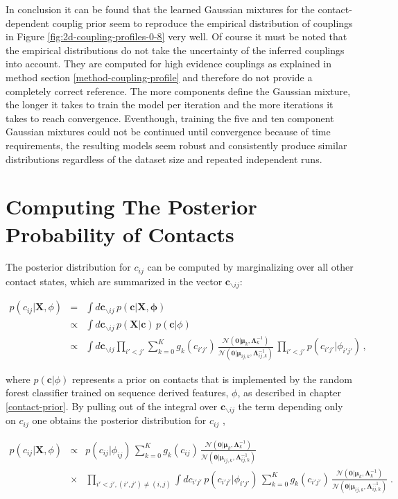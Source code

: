 \documentclass[11pt,a4paper,twoside]{book}
\newcommand{\Gauss}{\mathcal{N}}
\newcommand{\Lijk}{\mathbf{\Lambda}_{ij,k}}
\newcommand{\Lk}{\mathbf{\Lambda}_k}
\newcommand{\muijk}{\mathbf{\mu}_{ij,k}}
\newcommand{\muk}{\mathbf{\mu}_k}
\renewcommand{\c}{\mathbf{c}}
\newcommand{\cij}{c_{ij}}
\newcommand{\X}{\mathbf{X}}
\theoremstyle{definition}
\theoremstyle{definition}
\theoremstyle{remark}
\begin{document}
In conclusion it can be found that the learned Gaussian mixtures for the
contact-dependent couplig prior seem to reproduce the empirical
distribution of couplings in Figure \ref{fig:2d-coupling-profiles-0-8}
very well. Of course it must be noted that the empirical distributions
do not take the uncertainty of the inferred couplings into account. They
are computed for high evidence couplings as explained in method section
\ref{method-coupling-profile} and therefore do not provide a completely
correct reference. The more components define the Gaussian mixture, the
longer it takes to train the model per iteration and the more iterations
it takes to reach convergence. Eventhough, training the five and ten
component Gaussian mixtures could not be continued until convergence
because of time requirements, the resulting models seem robust and
consistently produce similar distributions regardless of the dataset
size and repeated independent runs.

\section{Computing The Posterior Probability of
Contacts}\label{posterior-of-rij}

The posterior distribution for \(c_{ij}\) can be computed by
marginalizing over all other contact states, which are summarized in the
vector \(\c_{\backslash ij}\):

\begin{eqnarray}
    p(\cij | \X, \phi) &=& \int d \c_{\backslash ij} \, p(\c |\X, \mathbf{\phi}) \nonumber\\
                &\propto & \int d \c_{\backslash ij} \, p(\X|\c) \, p(\c | \phi) \nonumber\\
                &\propto & \int d \c_{\backslash ij} \prod_{i'<j'} \sum_{k=0}^K g_{k}(c_{i'j'}) \, \frac{\Gauss( \mathbf{0} | \muk, \Lk^{-1})}{\Gauss(\mathbf{0} | \muijk, \Lijk^{-1})}
 \, \prod_{i'<j'} p(c_{i'j'} |\phi_{i'j'})  \,,
 \end{eqnarray}

where \(p(\c | \phi)\) represents a prior on contacts that is
implemented by the random forest classifier trained on sequence derived
features, \(\phi\), as described in chapter \ref{contact-prior}. By
pulling out of the integral over \(\c_{\backslash ij}\) the term
depending only on \(\cij\) one obtains the posterior distribution for
\(c_{ij}\) ,

\begin{eqnarray}
    p(\cij | \X, \phi) & \propto & 
            p(\cij |\phi_{ij}) \, \sum_{k=0}^K g_{k}(\cij) \, \frac{\Gauss( \mathbf{0} | \muk, \Lk^{-1})}{\Gauss(\mathbf{0} | \muijk, \Lijk^{-1})} \nonumber\\
            & \times  & \prod_{i'<j', (i',j') \ne (i,j)} \int d c_{i'j'} \, p(c_{i'j'} |\phi_{i'j'}) \, \sum_{k=0}^K g_{k}(c_{i'j'}) \, \frac{\Gauss( \mathbf{0} | \muk, \Lk^{-1})}{\Gauss(\mathbf{0} | \muijk, \Lijk^{-1})} \; .
\end{eqnarray}
\end{document}
